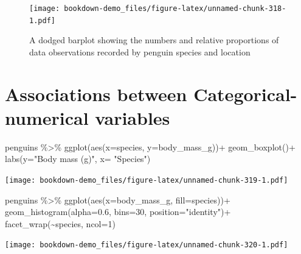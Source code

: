 \documentclass[
]{book}
\newenvironment{Shaded}{\begin{snugshade}}{\end{snugshade}}
\newcommand{\AttributeTok}[1]{\textcolor[rgb]{0.77,0.63,0.00}{#1}}
\newcommand{\DecValTok}[1]{\textcolor[rgb]{0.00,0.00,0.81}{#1}}
\newcommand{\FloatTok}[1]{\textcolor[rgb]{0.00,0.00,0.81}{#1}}
\newcommand{\FunctionTok}[1]{\textcolor[rgb]{0.00,0.00,0.00}{#1}}
\newcommand{\NormalTok}[1]{#1}
\newcommand{\SpecialCharTok}[1]{\textcolor[rgb]{0.00,0.00,0.00}{#1}}
\newcommand{\StringTok}[1]{\textcolor[rgb]{0.31,0.60,0.02}{#1}}
\begin{document}
\begin{figure}
\centering
\texttt{[image: bookdown-demo\_files/figure-latex/unnamed-chunk-318-1.pdf]}
\caption{\label{fig:unnamed-chunk-318}A dodged barplot showing the numbers and relative proportions of data observations recorded by penguin species and location}
\end{figure}

\hypertarget{associations-between-categorical-numerical-variables}{%
\section{Associations between Categorical-numerical variables}\label{associations-between-categorical-numerical-variables}}

\begin{Shaded}
\begin{Highlighting}[]
\NormalTok{penguins }\SpecialCharTok{\%\textgreater{}\%} 
  \FunctionTok{ggplot}\NormalTok{(}\FunctionTok{aes}\NormalTok{(}\AttributeTok{x=}\NormalTok{species,}
             \AttributeTok{y=}\NormalTok{body\_mass\_g))}\SpecialCharTok{+}
  \FunctionTok{geom\_boxplot}\NormalTok{()}\SpecialCharTok{+}
  \FunctionTok{labs}\NormalTok{(}\AttributeTok{y=}\StringTok{"Body mass (g)"}\NormalTok{,}
         \AttributeTok{x=} \StringTok{"Species"}\NormalTok{)}
\end{Highlighting}
\end{Shaded}

\texttt{[image: bookdown-demo\_files/figure-latex/unnamed-chunk-319-1.pdf]}

\begin{Shaded}
\begin{Highlighting}[]
\NormalTok{penguins }\SpecialCharTok{\%\textgreater{}\%} 
  \FunctionTok{ggplot}\NormalTok{(}\FunctionTok{aes}\NormalTok{(}\AttributeTok{x=}\NormalTok{body\_mass\_g,}
             \AttributeTok{fill=}\NormalTok{species))}\SpecialCharTok{+}
  \FunctionTok{geom\_histogram}\NormalTok{(}\AttributeTok{alpha=}\FloatTok{0.6}\NormalTok{,}
         \AttributeTok{bins=}\DecValTok{30}\NormalTok{,}
         \AttributeTok{position=}\StringTok{"identity"}\NormalTok{)}\SpecialCharTok{+}
  \FunctionTok{facet\_wrap}\NormalTok{(}\SpecialCharTok{\textasciitilde{}}\NormalTok{species,}
             \AttributeTok{ncol=}\DecValTok{1}\NormalTok{)}
\end{Highlighting}
\end{Shaded}

\texttt{[image: bookdown-demo\_files/figure-latex/unnamed-chunk-320-1.pdf]}
\end{document}

